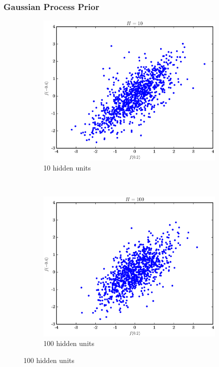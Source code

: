 \documentclass{beamer}
\begin{document}
% 
% 
% 
% 
\begin{frame}
  \frametitle{Gaussian Process Prior}
  \begin{figure}[!h]
    \centering
    \begin{subfigure}[b]{0.5\textwidth}
      \centering
      \includegraphics[width=\linewidth]{./figs/10.eps}
      \caption{10 hidden units}
    \end{subfigure}%
    ~ 
    \begin{subfigure}[b]{0.5\textwidth}
      \centering
      \includegraphics[width=\linewidth]{./figs/100.eps}
      \caption{100 hidden units}
    \end{subfigure}
  \end{figure}
\end{frame}
\end{document}
